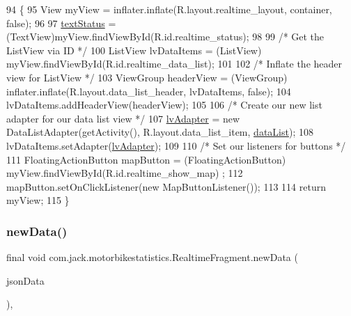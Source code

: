 \begin{DoxyCode}
94                                                                                                       \{
95         View myView = inflater.inflate(R.layout.realtime\_layout, container, \textcolor{keyword}{false});
96 
97         \hyperlink{classcom_1_1jack_1_1motorbikestatistics_1_1_realtime_fragment_a934eb88d5412c4a06635e8b2dcdde397}{textStatus} = (TextView)myView.findViewById(R.id.realtime\_status);
98 
99         \textcolor{comment}{/* Get the ListView via ID */}
100         ListView lvDataItems = (ListView) myView.findViewById(R.id.realtime\_data\_list);
101 
102         \textcolor{comment}{/* Inflate the header view for ListView */}
103         ViewGroup headerView = (ViewGroup) inflater.inflate(R.layout.data\_list\_header, lvDataItems, \textcolor{keyword}{false});
104         lvDataItems.addHeaderView(headerView);
105 
106         \textcolor{comment}{/* Create our new list adapter for our data list view */}
107         \hyperlink{classcom_1_1jack_1_1motorbikestatistics_1_1_realtime_fragment_ae5e621d6d5f22ddb72ace3ca227f3760}{lvAdapter} = \textcolor{keyword}{new} DataListAdapter(getActivity(), R.layout.data\_list\_item, 
      \hyperlink{classcom_1_1jack_1_1motorbikestatistics_1_1_realtime_fragment_adde56e8b4f0e954a9a1167e50fb80420}{dataList});
108         lvDataItems.setAdapter(\hyperlink{classcom_1_1jack_1_1motorbikestatistics_1_1_realtime_fragment_ae5e621d6d5f22ddb72ace3ca227f3760}{lvAdapter});
109 
110         \textcolor{comment}{/* Set our listeners for buttons */}
111         FloatingActionButton mapButton = (FloatingActionButton) myView.findViewById(R.id.realtime\_show\_map)
      ;
112         mapButton.setOnClickListener(\textcolor{keyword}{new} MapButtonListener());
113 
114         \textcolor{keywordflow}{return} myView;
115     \}
\end{DoxyCode}
\mbox{\label{classcom_1_1jack_1_1motorbikestatistics_1_1_realtime_fragment_a675832561a8d63214b8f2cd59e901de5}} 
\subsubsection{\texorpdfstring{new\+Data()}{newData()}}
{\footnotesize\ttfamily final void com.\+jack.\+motorbikestatistics.\+Realtime\+Fragment.\+new\+Data (\begin{DoxyParamCaption}\item[{J\+S\+O\+N\+Object}]{json\+Data }\end{DoxyParamCaption})\hspace{0.3cm}{\ttfamily [inline]}, {\ttfamily [private]}}



